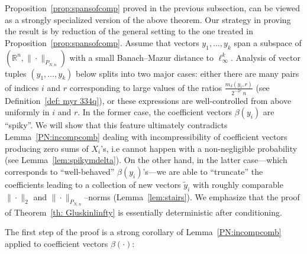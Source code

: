 \documentclass[11pt]{amsart}
\theoremstyle{definition}
\theoremstyle{plain}
\newcommand{\R}{\mathbb{R}}
\def\R{{\mathbb R}}
\begin{document}
Proposition~\ref{prop:spansofcomp} proved in the previous
subsection, can be viewed as a strongly specialized
version of the above theorem.
Our strategy in proving the result
is by reduction of the general setting to the one treated in
Proposition~\ref{prop:spansofcomp}.
Assume that vectors $y_1,\dots,y_k$
span a subspace of $(\R^n,\|\cdot\|_{P_{N,n}})$
with a small Banach--Mazur distance to $\ell_\infty^k$.
Analysis of vector tuples $(y_1,\dots,y_k)$ below
splits into two major cases: either
there are many pairs of indices $i$ and $r$ corresponding
to large values of
the ratios $\frac{m_\delta(y_i,r)}{2^{-2r}\,n}$ (see Definition~\ref{def: myr 334q}),
or these expressions
are well-controlled from above uniformly in $i$ and $r$.
In the former case, the coefficient vectors $\beta(y_i)$
are ``spiky''. We will show that this feature
ultimately contradicts Lemma~\ref{PN:incompcomb} dealing with
incompressibility of coefficient vectors producing 
zero sums of $X_i$'s, i.e cannot happen with a non-negligible probability
(see Lemma~\ref{lem:spikymdelta}).
On the other hand, in the latter case---which corresponds
to ``well-behaved'' $\beta(y_i)$'s---we are able
to ``truncate'' the coefficients leading to
a collection of new vectors $\tilde y_i$
with roughly comparable $\|\cdot\|_2$ and $\|\cdot\|_{P_{N,n}}$--norms (Lemma~\ref{lem:stairs}).
We emphasize that the proof of Theorem~\ref{th: Gluskinlinfty}
is essentially deterministic after conditioning.

\medskip

The first step of the proof is a strong corollary
of Lemma~\ref{PN:incompcomb} applied to coefficient vectors
$\beta(\cdot)$:
\end{document}

